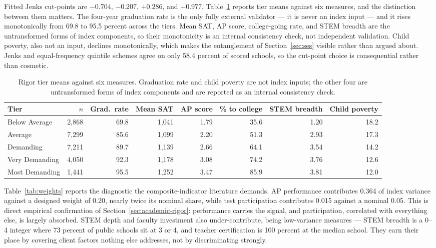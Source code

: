 \documentclass[12pt]{article}
\begin{document}
Fitted Jenks cut-points are $-0.704$, $-0.207$, $+0.286$, and $+0.977$. Table~\ref{tab:validation} reports tier means against six measures, and the distinction between them matters. The four-year graduation rate is the only fully external validator --- it is never an index input --- and it rises monotonically from 69.8 to 95.5 percent across the tiers. Mean SAT, AP score, college-going rate, and STEM breadth are the untransformed forms of index components, so their monotonicity is an internal consistency check, not independent validation. Child poverty, also not an input, declines monotonically, which makes the entanglement of Section~\ref{sec:ses} visible rather than argued about. Jenks and equal-frequency quintile schemes agree on only 58.4 percent of scored schools, so the cut-point choice is consequential rather than cosmetic.

\begin{table}[htbp]
\centering
\singlespacing\small
\caption{Rigor tier means against six measures. Graduation rate and child poverty are not index inputs; the other four are untransformed forms of index components and are reported as an internal consistency check.}
\label{tab:validation}
\setlength{\tabcolsep}{4.5pt}
\begin{tabular}{@{}lrrrrrrr@{}}
\toprule
Tier & $n$ & Grad.\ rate & Mean SAT & AP score & \% to college & STEM breadth & Child poverty \\
\midrule
Below Average   & 2{,}868 & 69.8 & 1{,}041 & 1.79 & 35.6 & 1.20 & 18.2 \\
Average         & 7{,}299 & 85.6 & 1{,}099 & 2.20 & 51.3 & 2.93 & 17.3 \\
Demanding       & 7{,}211 & 89.7 & 1{,}139 & 2.66 & 64.1 & 3.54 & 14.2 \\
Very Demanding  & 4{,}050 & 92.3 & 1{,}178 & 3.08 & 74.2 & 3.76 & 12.6 \\
Most Demanding  & 1{,}441 & 95.5 & 1{,}252 & 3.47 & 85.9 & 3.81 & 12.0 \\
\bottomrule
\end{tabular}
\end{table}

Table~\ref{tab:weights} reports the diagnostic the composite-indicator literature demands. AP performance contributes 0.364 of index variance against a designed weight of 0.20, nearly twice its nominal share, while test participation contributes 0.015 against a nominal 0.05. This is direct empirical confirmation of Section~\ref{sec:academic-rigor}: performance carries the signal, and participation, correlated with everything else, is largely absorbed. STEM depth and faculty investment also under-contribute, being low-variance measures --- STEM breadth is a 0--4 integer where 73 percent of public schools sit at 3 or 4, and teacher certification is 100 percent at the median school. They earn their place by covering client factors nothing else addresses, not by discriminating strongly.
\end{document}
